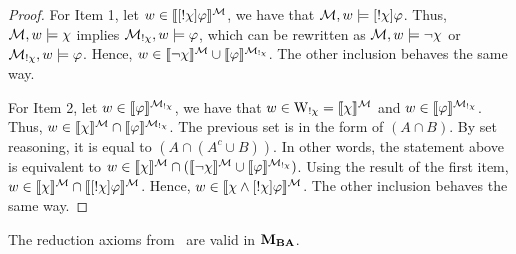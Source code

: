 	\begin{proof}
 For Item 1, let $w \in \llbracket [!\chi]\varphi \rrbracket^{\mathcal{M}}$, we have that $\mathcal{M},w \models [!\chi]\varphi$. Thus, $\mathcal{M},w \models \chi$ implies $\mathcal{M}_{!\chi},w \models \varphi$, which can be rewritten as $\mathcal{M},w \models \neg\chi$ or $\mathcal{M}_{!\chi},w \models \varphi$. Hence, $w \in \llbracket \neg\chi \rrbracket^{\mathcal{M}} \cup \llbracket \varphi \rrbracket^{\mathcal{M}_{!\chi}}$. The other inclusion behaves the same way.
 
 
For Item 2, let $w \in \llbracket \varphi \rrbracket^{\mathcal{M}_{!\chi}}$, we have that $w \in \operatorname{W}_{!\chi} = \llbracket \chi \rrbracket^{\mathcal{M}}$ and $w \in \llbracket \varphi \rrbracket^{\mathcal{M}_{!\chi}}$. Thus, $w \in \llbracket \chi \rrbracket^{\mathcal{M}} \cap \llbracket \varphi \rrbracket^{\mathcal{M}_{!\chi}}$. The previous set is in the form of $(A \cap B)$. By set reasoning, it is equal to $(A \cap (A^c \cup B))$.
	In other words, the statement above is equivalent to $w \in \llbracket \chi \rrbracket^{\mathcal{M}} \cap (\llbracket \neg\chi \rrbracket^{\mathcal{M}} \cup \llbracket \varphi \rrbracket^{\mathcal{M}_{!\chi}})$. Using the result of the first item, $w \in \llbracket \chi \rrbracket^{\mathcal{M}} \cap \llbracket [!\chi]\varphi \rrbracket^{\mathcal{M}}$. Hence, $w \in \llbracket \chi \wedge [!\chi]\varphi \rrbracket^{\mathcal{M}}$.
	The other inclusion behaves the same way.
	\end{proof}

\begin{lemma}\label{lemma:palkh-valid}
	The reduction axioms from~ are valid in $\mathbf{M}_{\mathbf{BA}}$.
	\end{lemma}
	
